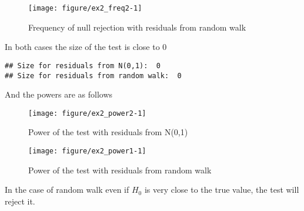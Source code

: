 \documentclass[12pt, a4paper]{article}\usepackage[]{graphicx}\usepackage[]{color}
\makeatletter
\def\maxwidth{ %
  \ifdim\Gin@nat@width>\linewidth
    \linewidth
  \else
    \Gin@nat@width
  \fi
}
\newenvironment{kframe}{%
 \def\at@end@of@kframe{}%
 \ifinner\ifhmode%
  \def\at@end@of@kframe{\end{minipage}}%
  \begin{minipage}{\columnwidth}%
 \fi\fi%
 \def\FrameCommand##1{\hskip\@totalleftmargin \hskip-\fboxsep
 \colorbox{shadecolor}{##1}\hskip-\fboxsep
     \hskip-\linewidth \hskip-\@totalleftmargin \hskip\columnwidth}%
 \MakeFramed {\advance\hsize-\width
   \@totalleftmargin\z@ \linewidth\hsize
   \@setminipage}}%
 {\par\unskip\endMakeFramed%
 \at@end@of@kframe}
\newenvironment{knitrout}{}{} %
\makeatother
\begin{document}
\begin{knitrout}
\color{fgcolor}\begin{figure}[H]

{\centering \texttt{[image: figure/ex2\_freq2-1]} 

}

\caption[Frequency of null rejection with residuals from random walk]{Frequency of null rejection with residuals from random walk}\label{fig:ex2.freq2}
\end{figure}


\end{knitrout}

In both cases the size of the test is close to 0
\begin{knitrout}
\color{fgcolor}\begin{kframe}
\begin{verbatim}
## Size for residuals from N(0,1):  0
## Size for residuals from random walk:  0
\end{verbatim}
\end{kframe}
\end{knitrout}

And the powers are as follows 
\begin{knitrout}
\color{fgcolor}\begin{figure}[H]

{\centering \texttt{[image: figure/ex2\_power2-1]} 

}

\caption[Power of the test with residuals from N(0,1)]{Power of the test with residuals from N(0,1)}\label{fig:ex2.power2}
\end{figure}


\end{knitrout}

\begin{knitrout}
\color{fgcolor}\begin{figure}[H]

{\centering \texttt{[image: figure/ex2\_power1-1]} 

}

\caption[Power of the test with residuals from random walk]{Power of the test with residuals from random walk}\label{fig:ex2.power1}
\end{figure}


\end{knitrout}

In the case of random walk even if $H_0$ is very close to the true value, the test will reject it.
\end{document}
